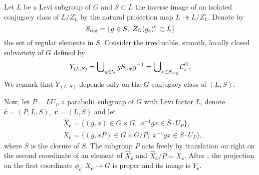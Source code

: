 \documentclass[11pt]{amsart}
\theoremstyle{definition}
\def\reg{{\rm reg}}
\begin{document}
Let $L$ be a Levi subgroup of $G$ and $S \subset L$ the inverse image of an isolated 
conjugacy class of $L/Z_{L}^{\circ}$ by the natural projection map 
$L \twoheadrightarrow L/Z_{L}^{\circ}$. Denote by 
\[
S_{\reg}=\{g \in S, \,\, Z_G(g_s)^{\circ} \subset L \}
\] 
the set of regular elements in $S$.
Consider the irreducible, smooth, locally closed subvariety of $G$ defined by 
\[ 
Y_{(L,S)} = \bigcup\nolimits_{g\in G} g S_{\reg} g^{-1} = 
\bigcup\nolimits_{x \in S_{\reg}} \mathcal{C}_{x}^G. 
\] 
We remark that $Y_{(L,S)}$ depends only on the $G$-conjugacy class of $(L,S)$.
 
Now, let $P=L U_P$ a parabolic subgroup of $G$ with Levi factor $L$,  denote  
$\overline{\mathbf{c}}=(P,L,S), \,\, \mathbf{c}=(L,S)$ and let 
\begin{align*}
& \widehat{X}_{\overline{\mathbf{c}}}=\{(g,x) \in G \times G, 
\,\, x^{-1}g x \in \overline{S} \cdot U_P \}, \\
& X_{\overline{\mathbf{c}}}=\{(g,xP) \in G \times G/P, \,\, 
x^{-1}g x \in \overline{S} \cdot U_P \},
\end{align*} 
where $\overline{S}$ is the closure of $S$. The subgroup $P$ acts freely by 
translation on right on the second coordinate of an element of 
$\widehat{X}_{\overline{\mathbf{c}}}$  and $\widehat{X}_{\overline{\mathbf{c}}}/P = 
X_{\overline{\mathbf{c}}}$. After \cite[4.3]{Lus1}, the projection on the 
first coordinate $\phi_{\overline{\mathbf{c}}} : X_{\overline{\mathbf{c}}} 
\longrightarrow G$ is proper and its image is $\overline{Y}_{\mathbf{c}}$.
\end{document}
